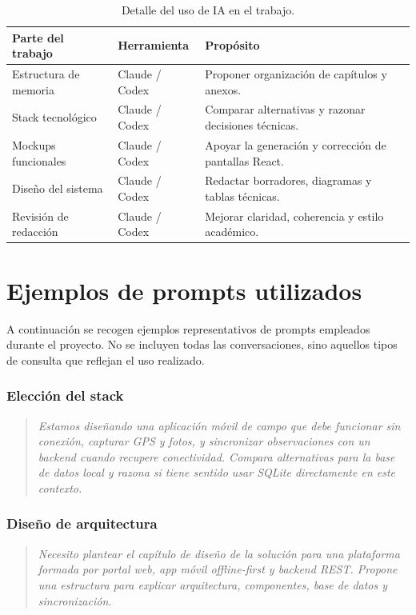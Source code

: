 \begin{table}[H]
  \centering
  \caption{Detalle del uso de IA en el trabajo.}
  \label{tab:uso-ia}
  \begin{tabularx}{\textwidth}{llX}
    \toprule
    \textbf{Parte del trabajo} & \textbf{Herramienta} & \textbf{Propósito} \\
    \midrule
    Estructura de memoria & Claude / Codex & Proponer organización de capítulos y anexos. \\
    Stack tecnológico & Claude / Codex & Comparar alternativas y razonar decisiones técnicas. \\
    Mockups funcionales & Claude / Codex & Apoyar la generación y corrección de pantallas React. \\
    Diseño del sistema & Claude / Codex & Redactar borradores, diagramas y tablas técnicas. \\
    Revisión de redacción & Claude / Codex & Mejorar claridad, coherencia y estilo académico. \\
    \bottomrule
  \end{tabularx}
\end{table}

\section{Ejemplos de prompts utilizados}

A continuación se recogen ejemplos representativos de prompts empleados durante el
proyecto. No se incluyen todas las conversaciones, sino aquellos tipos de consulta
que reflejan el uso realizado.

\subsubsection*{Elección del stack}
\begin{quote}
\textit{Estamos diseñando una aplicación móvil de campo que debe funcionar sin
conexión, capturar GPS y fotos, y sincronizar observaciones con un backend cuando
recupere conectividad. Compara alternativas para la base de datos local y razona si
tiene sentido usar SQLite directamente en este contexto.}
\end{quote}

\subsubsection*{Diseño de arquitectura}
\begin{quote}
\textit{Necesito plantear el capítulo de diseño de la solución para una plataforma
formada por portal web, app móvil offline-first y backend REST. Propone una
estructura para explicar arquitectura, componentes, base de datos y sincronización.}
\end{quote}

